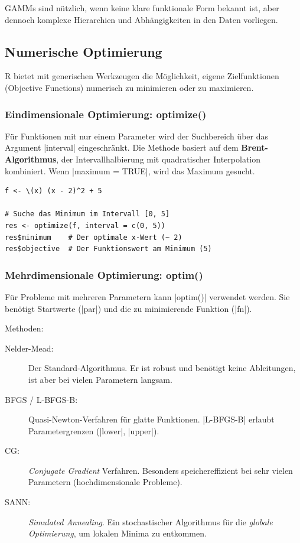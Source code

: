 \documentclass[10pt,twocolumn]{scrartcl}
\renewcommand{\lstinline}{\mycoloredinline}
\begin{document}
GAMMs sind nützlich, wenn keine klare funktionale Form bekannt ist, aber dennoch komplexe Hierarchien und Abhängigkeiten in den Daten vorliegen.


\subsection{Numerische Optimierung}

R bietet mit generischen Werkzeugen die Möglichkeit, eigene Zielfunktionen (Objective Functions) numerisch zu minimieren oder zu maximieren.

\subsubsection{Eindimensionale Optimierung: optimize()}
Für Funktionen mit nur einem Parameter wird der Suchbereich über das Argument \lstinline|interval| eingeschränkt. Die Methode basiert auf dem \textbf{Brent-Algorithmus}, der Intervallhalbierung mit quadratischer Interpolation kombiniert. Wenn \lstinline|maximum = TRUE|, wird das Maximum gesucht.

\begin{lstlisting}
f <- \(x) (x - 2)^2 + 5

# Suche das Minimum im Intervall [0, 5]
res <- optimize(f, interval = c(0, 5))
res$minimum    # Der optimale x-Wert (~ 2)
res$objective  # Der Funktionswert am Minimum (5)
\end{lstlisting}

\subsubsection{Mehrdimensionale Optimierung: optim()}
Für Probleme mit mehreren Parametern kann \lstinline|optim()| verwendet werden. Sie benötigt Startwerte (\lstinline|par|) und die zu minimierende Funktion (\lstinline|fn|).

Methoden:
\begin{description}
\item[Nelder-Mead:] Der Standard-Algorithmus. Er ist robust und benötigt keine Ableitungen, ist aber bei vielen Parametern langsam.
\item[BFGS / L-BFGS-B:] Quasi-Newton-Verfahren für glatte Funktionen. \lstinline|L-BFGS-B| erlaubt Parametergrenzen (\lstinline|lower|, \lstinline|upper|).
\item[CG:] \emph{Conjugate Gradient} Verfahren. Besonders speichereffizient bei sehr vielen Parametern (hochdimensionale Probleme).
\item[SANN:] \emph{Simulated Annealing}. Ein stochastischer Algorithmus für die \emph{globale Optimierung}, um lokalen Minima zu entkommen.
\end{description}
\end{document}
